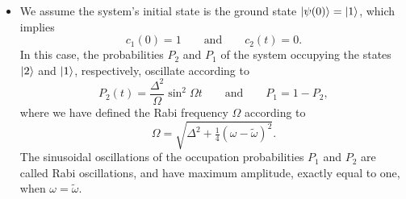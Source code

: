 \documentclass[11pt, a4paper]{article}
\begin{document}
\begin{itemize}
    \item We assume the system's initial state is the ground state $ \ket{\psi(0)} = \ket{1} $, which implies
    \begin{equation*}
        c_{1}(0) = 1 \qquad \text{and} \qquad c_{2}(t) = 0.
    \end{equation*}
    In this case, the probabilities $ P_{2} $ and $ P_{1} $ of the system occupying the states $ \ket{2} $ and $ \ket{1} $, respectively, oscillate according to
    \begin{equation*}
        P_{2}(t) = \frac{\Delta^{2}}{\Omega}\sin^{2}\Omega t \qquad \text{and} \qquad P_{1} = 1 - P_{2},
    \end{equation*}
    where we have defined the Rabi frequency $ \Omega $ according to
    \begin{equation*}
        \Omega = \sqrt{\Delta^{2} + \tfrac{1}{4}(\omega - \tilde{\omega})^{2}}.
    \end{equation*}
    The sinusoidal oscillations of the occupation probabilities $ P_{1} $ and $ P_{2} $ are called Rabi oscillations, and have maximum amplitude, exactly equal to one, when $ \omega = \tilde{\omega} $.
    
\end{itemize}
\end{document}
